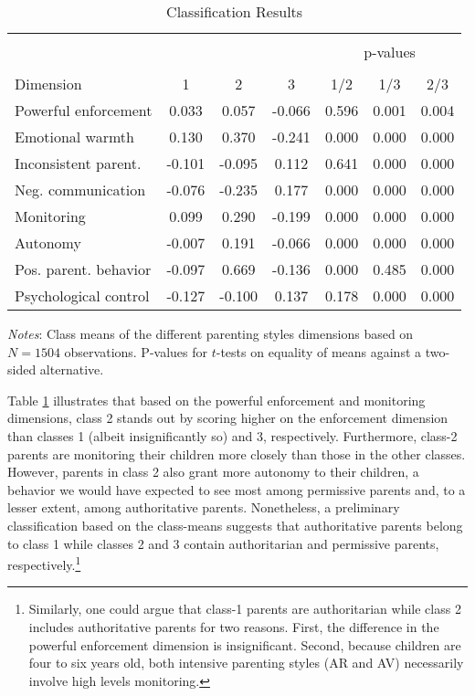 \begin{table}[!htbp]
	\centering
	\begin{threeparttable}
		\caption{Classification Results}
		\label{tab:class}
		\begin{tabular}{lcccccc}
			\hline \hline\\[-1.8ex] 
			&    &    &    &\multicolumn{3}{c}{p-values} \\ 
			\cline{5-7} \\[-1.8ex]Dimension & 1 & 2 & 3 & 1/2 & 1/3 & 2/3 \\ 
			\midrule
			Powerful enforcement & 0.033 & 0.057 & -0.066 & 0.596 & 0.001 & 0.004 \\ 
			Emotional warmth & 0.130 & 0.370 & -0.241 & 0.000 & 0.000 & 0.000 \\ 
			Inconsistent parent. & -0.101 & -0.095 & 0.112 & 0.641 & 0.000 & 0.000 \\ 
			Neg. communication & -0.076 & -0.235 & 0.177 & 0.000 & 0.000 & 0.000 \\ 
			Monitoring & 0.099 & 0.290 & -0.199 & 0.000 & 0.000 & 0.000 \\ 
			Autonomy & -0.007 & 0.191 & -0.066 & 0.000 & 0.000 & 0.000 \\ 
			Pos. parent. behavior & -0.097 & 0.669 & -0.136 & 0.000 & 0.485 & 0.000 \\ 
			Psychological control & -0.127 & -0.100 & 0.137 & 0.178 & 0.000 & 0.000 \\ 
			\hline \bottomrule
		\end{tabular}
		\begin{tablenotes}
			\small
			\item \textit{Notes}: Class means of the different parenting styles dimensions based on $N = 1504$ observations. P-values for $t$-tests on equality of means against a two-sided alternative.
		\end{tablenotes}
	\end{threeparttable}
\end{table}
%

Table \ref{tab:class} illustrates that based on the powerful enforcement and monitoring dimensions, class 2 stands out by scoring higher on the enforcement dimension than classes 1 (albeit insignificantly so) and 3, respectively. Furthermore, class-2 parents are monitoring their children more closely than those in the other classes. However, parents in class 2 also grant more autonomy to their children, a behavior we would have expected to see most among permissive parents and, to a lesser extent, among authoritative parents. Nonetheless, a preliminary classification based on the class-means suggests that authoritative parents belong to class 1 while classes 2 and 3 contain authoritarian and permissive parents, respectively.\footnote{
 Similarly, one could argue that class-1 parents are authoritarian while class 2 includes authoritative parents for two reasons. First, the difference in the powerful enforcement dimension is insignificant. Second, because children are four to six years old, both intensive parenting styles (AR and AV) necessarily involve high levels monitoring.
} 

